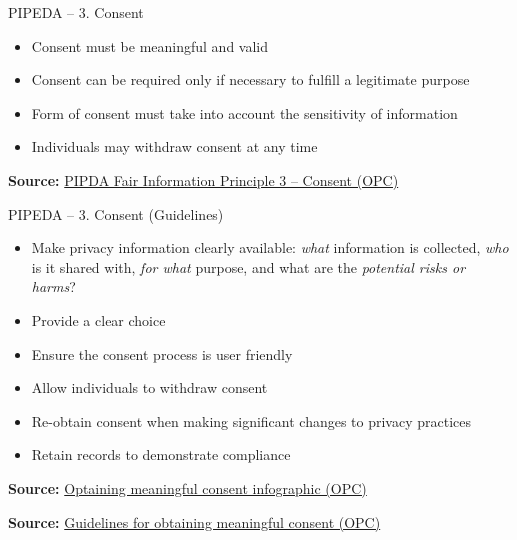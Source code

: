 \documentclass[ignorenonframetext,xcolor=x11names]{beamer}
\begin{document}
\begin{frame}{PIPEDA -- 3. Consent}
\begin{itemize}
   \item Consent must be meaningful and valid
   \item Consent can be required only if necessary to fulfill a legitimate purpose
   \item Form of consent must take into account the sensitivity of information
   \item Individuals may withdraw consent at any time
\end{itemize}

\vspace{\baselineskip}
\scriptsize \textbf{Source:} \href{https://www.priv.gc.ca/en/privacy-topics/privacy-laws-in-canada/the-personal-information-protection-and-electronic-documents-act-pipeda/p_principle/principles/p_consent/}{PIPDA Fair Information Principle 3 -- Consent (OPC)}
\end{frame}

\begin{frame}{PIPEDA -- 3. Consent \small (Guidelines)}
\begin{itemize}
   \item Make privacy information clearly available: \emph{what} information is collected, \emph{who} is it shared with, \emph{for what} purpose, and what are the \emph{potential risks or harms}?
   \item Provide a clear choice
   \item Ensure the consent process is user friendly
   \item Allow individuals to withdraw consent
   \item Re-obtain consent when making significant changes to privacy practices
   \item Retain records to demonstrate compliance
\end{itemize}

\vspace{\baselineskip}
\scriptsize \textbf{Source:} \href{https://www.priv.gc.ca/en/privacy-topics/collecting-personal-information/consent/info_mc/}{Optaining meaningful consent infographic (OPC)}

\vspace{\baselineskip}
\scriptsize \textbf{Source:} \href{https://www.priv.gc.ca/en/privacy-topics/collecting-personal-information/consent/gl_omc_201805/}{Guidelines for obtaining meaningful consent (OPC)}
\end{frame}
\end{document}
